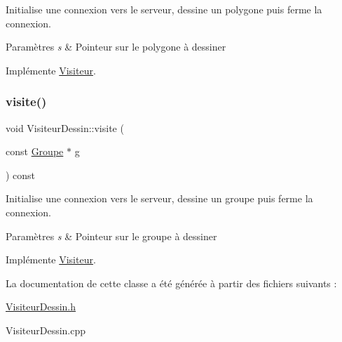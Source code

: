 Initialise une connexion vers le serveur, dessine un polygone puis ferme la connexion. 


\begin{DoxyParams}{Paramètres}
{\em s} & Pointeur sur le polygone à dessiner \\
\hline
\end{DoxyParams}


Implémente \mbox{\hyperlink{class_visiteur_a0a7c596d84a8750e3a670330a1001538}{Visiteur}}.

\mbox{\label{class_visiteur_dessin_a295e7bd446e4650257d0cb8c4d8c9ec5}} 
\subsubsection{\texorpdfstring{visite()}{visite()}\hspace{0.1cm}{\footnotesize\ttfamily [5/5]}}
{\footnotesize\ttfamily void Visiteur\+Dessin\+::visite (\begin{DoxyParamCaption}\item[{const \mbox{\hyperlink{class_groupe}{Groupe}} $\ast$}]{g }\end{DoxyParamCaption}) const\hspace{0.3cm}{\ttfamily [virtual]}}



Initialise une connexion vers le serveur, dessine un groupe puis ferme la connexion. 


\begin{DoxyParams}{Paramètres}
{\em s} & Pointeur sur le groupe à dessiner \\
\hline
\end{DoxyParams}


Implémente \mbox{\hyperlink{class_visiteur_a812aa03fad51d8aec386f8df7f9b5353}{Visiteur}}.



La documentation de cette classe a été générée à partir des fichiers suivants \+:\begin{DoxyCompactItemize}
\item 
\mbox{\hyperlink{_visiteur_dessin_8h}{Visiteur\+Dessin.\+h}}\item 
Visiteur\+Dessin.\+cpp\end{DoxyCompactItemize}
